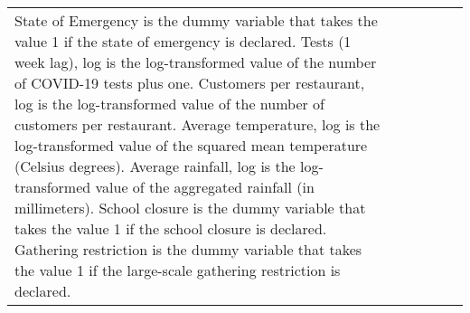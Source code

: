 \begin{table}[!htbp]
\begin{tabular}{@{\extracolsep{1pt}}lccccc}
{{State of Emergency is the dummy variable that takes the value 1 if the state of emergency is declared. 
Tests (1 week lag), log is the log-transformed value of the number of COVID-19 tests plus one.
Customers per restaurant, log is the log-transformed value of the number of customers per restaurant.
Average temperature, log is the log-transformed value of the squared mean temperature (Celsius degrees).
Average rainfall, log is the log-transformed value of the aggregated rainfall (in millimeters).
School closure is the dummy variable that takes the value 1 if the school closure is declared. 
Gathering restriction is the dummy variable that takes the value 1 if the large-scale gathering restriction is declared.}} \\
\end{tabular} 
\end{table} 
